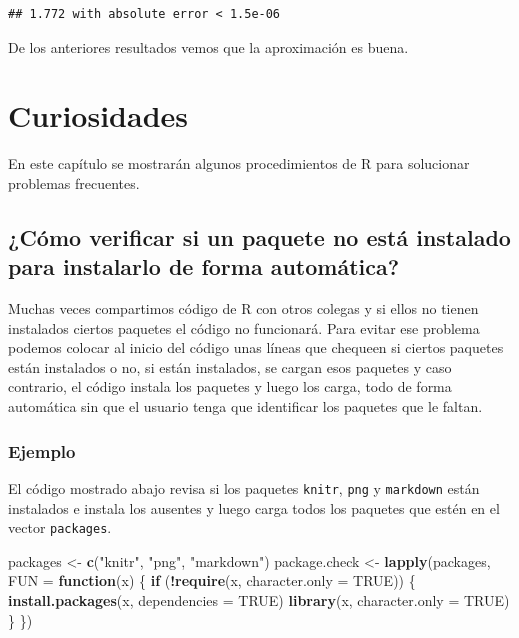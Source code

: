 \documentclass[10pt,]{krantz}
\makeatletter
\newenvironment{Shaded}{\begin{snugshade}}{\end{snugshade}}
\newcommand{\KeywordTok}[1]{\textcolor[rgb]{0.13,0.29,0.53}{\textbf{#1}}}
\newcommand{\DataTypeTok}[1]{\textcolor[rgb]{0.13,0.29,0.53}{#1}}
\newcommand{\StringTok}[1]{\textcolor[rgb]{0.31,0.60,0.02}{#1}}
\newcommand{\OtherTok}[1]{\textcolor[rgb]{0.56,0.35,0.01}{#1}}
\newcommand{\ControlFlowTok}[1]{\textcolor[rgb]{0.13,0.29,0.53}{\textbf{#1}}}
\newcommand{\OperatorTok}[1]{\textcolor[rgb]{0.81,0.36,0.00}{\textbf{#1}}}
\newcommand{\NormalTok}[1]{#1}
\newenvironment{kframe}{%
\medskip{}
\setlength{\fboxsep}{.8em}
 \def\at@end@of@kframe{}%
 \ifinner\ifhmode%
  \def\at@end@of@kframe{\end{minipage}}%
  \begin{minipage}{\columnwidth}%
 \fi\fi%
 \def\FrameCommand##1{\hskip\@totalleftmargin \hskip-\fboxsep
 \colorbox{shadecolor}{##1}\hskip-\fboxsep
     \hskip-\linewidth \hskip-\@totalleftmargin \hskip\columnwidth}%
 \MakeFramed {\advance\hsize-\width
   \@totalleftmargin\z@ \linewidth\hsize
   \@setminipage}}%
 {\par\unskip\endMakeFramed%
 \at@end@of@kframe}
\renewenvironment{Shaded}{\begin{kframe}}{\end{kframe}}
\makeatother
\begin{document}
\begin{verbatim}
## 1.772 with absolute error < 1.5e-06
\end{verbatim}

De los anteriores resultados vemos que la aproximación es buena.

\chapter{Curiosidades}\label{curio}

En este capítulo se mostrarán algunos procedimientos de R para
solucionar problemas frecuentes.

\section{¿Cómo verificar si un paquete no está instalado para instalarlo
de forma
automática?}\label{como-verificar-si-un-paquete-no-esta-instalado-para-instalarlo-de-forma-automatica}

Muchas veces compartimos código de R con otros colegas y si ellos no
tienen instalados ciertos paquetes el código no funcionará. Para evitar
ese problema podemos colocar al inicio del código unas líneas que
chequeen si ciertos paquetes están instalados o no, si están instalados,
se cargan esos paquetes y caso contrario, el código instala los paquetes
y luego los carga, todo de forma automática sin que el usuario tenga que
identificar los paquetes que le faltan.

\subsection*{Ejemplo}\label{ejemplo-76}


El código mostrado abajo revisa si los paquetes \texttt{knitr},
\texttt{png} y \texttt{markdown} están instalados e instala los ausentes
y luego carga todos los paquetes que estén en el vector
\texttt{packages}.

\begin{Shaded}
\begin{Highlighting}[]
\NormalTok{packages <-}\StringTok{  }\KeywordTok{c}\NormalTok{(}\StringTok{"knitr"}\NormalTok{, }\StringTok{"png"}\NormalTok{, }\StringTok{"markdown"}\NormalTok{)}
\NormalTok{package.check <-}\StringTok{ }\KeywordTok{lapply}\NormalTok{(packages, }\DataTypeTok{FUN =} \ControlFlowTok{function}\NormalTok{(x) \{}
  \ControlFlowTok{if}\NormalTok{ (}\OperatorTok{!}\KeywordTok{require}\NormalTok{(x, }\DataTypeTok{character.only =} \OtherTok{TRUE}\NormalTok{)) \{}
    \KeywordTok{install.packages}\NormalTok{(x, }\DataTypeTok{dependencies =} \OtherTok{TRUE}\NormalTok{)}
    \KeywordTok{library}\NormalTok{(x, }\DataTypeTok{character.only =} \OtherTok{TRUE}\NormalTok{)}
\NormalTok{  \}}
\NormalTok{\})}
\end{Highlighting}
\end{Shaded}



\backmatter
\printindex
\end{document}
